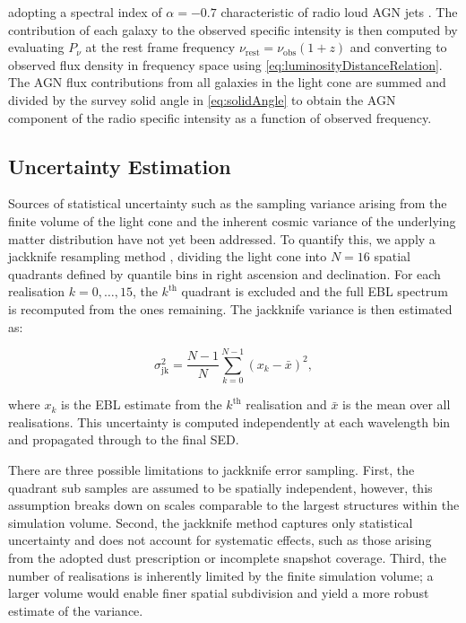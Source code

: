 \documentclass[
    a4paper, %
    10pt, %
    unnumberedsections, %
]{LTJournalArticle}
\begin{document}
\noindent adopting a spectral index of $\alpha = -0.7$ characteristic of radio loud AGN jets \parencite{thomasRadioGalaxyPopulation2021,angladaRadioJetsYoung2018}. The contribution of each galaxy to the observed specific intensity is then computed by evaluating $P_\nu$ at the rest frame frequency $\nu_{\mathrm{rest}} = \nu_{\mathrm{obs}}(1+z)$ and converting to observed flux density in frequency space using \cref{eq:luminosityDistanceRelation}. The AGN flux contributions from all galaxies in the light cone are summed and divided by the survey solid angle in \cref{eq:solidAngle} to obtain the AGN component of the radio specific intensity as a function of observed frequency.


\subsection{Uncertainty Estimation}

Sources of statistical uncertainty such as the sampling variance arising from the finite volume of the light cone and the inherent cosmic variance of the underlying matter distribution have not yet been addressed. To quantify this, we apply a jackknife resampling method \parencite{bergerJackknifeVarianceEstimator2007}, dividing the light cone into $N = 16$ spatial quadrants defined by quantile bins in right ascension and declination. For each realisation $k = 0, \ldots, 15$, the $k^{\mathrm{th}}$ quadrant is excluded and the full EBL spectrum is recomputed from the ones remaining. The jackknife variance is then estimated as:

\begin{equation}
    \sigma_\mathrm{jk}^2 = \frac{N-1}{N} \sum_{k=0}^{N-1} \left(x_k - \bar{x}\right)^2,
\end{equation}

\noindent where $x_k$ is the EBL estimate from the $k^{\mathrm{th}}$ realisation and $\bar{x}$ is the mean over all realisations. This uncertainty is computed independently at each wavelength bin and propagated through to the final SED.

There are three possible limitations to jackknife error sampling. First, the quadrant sub samples are assumed to be spatially independent, however, this assumption breaks down on scales comparable to the largest structures within the simulation volume. Second, the jackknife method captures only statistical uncertainty and does not account for systematic effects, such as those arising from the adopted dust prescription or incomplete snapshot coverage. Third, the number of realisations is inherently limited by the finite simulation volume; a larger volume would enable finer spatial subdivision and yield a more robust estimate of the variance.
 
\end{document}
